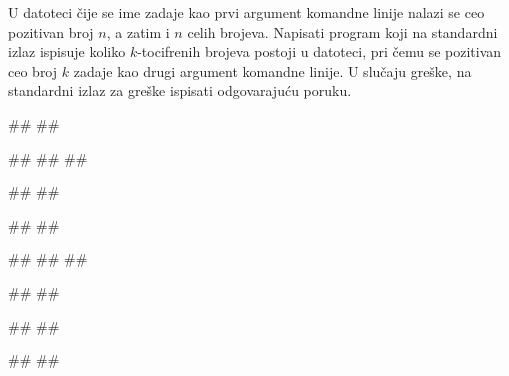 \begin{Exercise}[label=v3_03] 
U datoteci čije se ime zadaje kao prvi argument komandne linije
nalazi se ceo pozitivan broj $n$, a zatim i $n$ celih brojeva. Napisati program koji
na standardni izlaz ispisuje 
koliko $k$-tocifrenih brojeva postoji u datoteci, pri čemu se
pozitivan ceo broj $k$ zadaje kao drugi argument komandne linije.
U slučaju greške, na standardni izlaz za greške ispisati odgovarajuću poruku.

\begin{minitest}
\begin{upotreba}{1}
#\naslovPokretanje#
##

##
##
##

#\naslovIzlaz#
##
\end{upotreba}
\end{minitest}
\begin{minitest}
\begin{upotreba}{2}
#\naslovPokretanje#
##

##
##
##

#\naslovIzlaz#
##
\end{upotreba}
\end{minitest}
\begin{minitest}
\begin{upotreba}{3}
#\naslovPokretanje#
##

#\naslovIzlazZaGresku#
##
\end{upotreba}
\end{minitest}
\end{Exercise}
\begin{Answer}[ref=v3_03]
\end{Answer}


